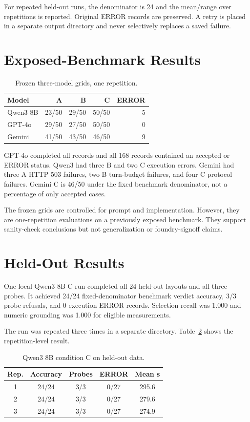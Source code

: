 \documentclass[10pt,twocolumn]{article}
\begin{document}
For repeated held-out runs, the denominator is 24 and the mean/range over repetitions
is reported. Original ERROR records are preserved. A retry is placed in a separate
output directory and never selectively replaces a saved failure.

\section{Exposed-Benchmark Results}
\begin{table}[h]
\centering
\caption{Frozen three-model grids, one repetition.}
\label{tab:frozen}
\small
\begin{tabular}{lrrrr}
\toprule
Model & A & B & C & ERROR \\
\midrule
Qwen3 8B & 23/50 & 29/50 & 50/50 & 5 \\
GPT-4o & 29/50 & 27/50 & 50/50 & 0 \\
Gemini & 41/50 & 43/50 & 46/50 & 9 \\
\bottomrule
\end{tabular}
\end{table}

GPT-4o completed all records and all 168 records contained an accepted or ERROR
status. Qwen3 had three B and two C execution errors. Gemini had three A HTTP 503
failures, two B turn-budget failures, and four C protocol failures. Gemini C is
46/50 under the fixed benchmark denominator, not a percentage of only accepted cases.

The frozen grids are controlled for prompt and implementation. However, they are
one-repetition evaluations on a previously exposed benchmark. They support
sanity-check conclusions but not generalization or foundry-signoff claims.

\clearpage
\section{Held-Out Results}
One local Qwen3 8B C run completed all 24 held-out layouts and all three probes.
It achieved 24/24 fixed-denominator benchmark verdict accuracy, 3/3 probe refusals,
and 0 execution ERROR records. Selection recall was 1.000 and numeric grounding was
1.000 for eligible measurements.

The run was repeated three times in a separate directory. Table~\ref{tab:heldout}
shows the repetition-level result.
\begin{table}[h]
\centering
\caption{Qwen3 8B condition C on held-out data.}
\label{tab:heldout}
\small
\begin{tabular}{ccccc}
\toprule
Rep. & Accuracy & Probes & ERROR & Mean s \\
\midrule
1 & 24/24 & 3/3 & 0/27 & 295.6 \\
2 & 24/24 & 3/3 & 0/27 & 279.6 \\
3 & 24/24 & 3/3 & 0/27 & 274.9 \\
\bottomrule
\end{tabular}
\end{table}
\end{document}
